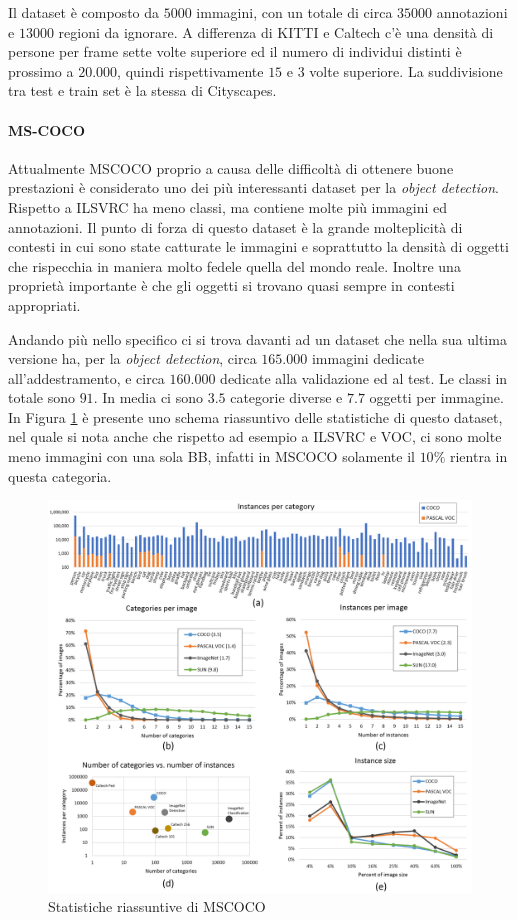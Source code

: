 Il dataset è composto da $5000$ immagini, con un totale di circa $35000$ annotazioni e $13000$ regioni da ignorare. A differenza di KITTI e Caltech c'è una densità di persone per frame sette volte superiore ed il numero di individui distinti è prossimo a $20.000$, quindi rispettivamente $15$ e $3$ volte superiore.  La suddivisione tra test e train set è la stessa di Cityscapes. 

\paragraph{MS-COCO} \cite{lin2014microsoft}
Attualmente \ac{MSCOCO} proprio a causa delle difficoltà di ottenere buone prestazioni è considerato uno dei più interessanti dataset per la \textit{object detection}. Rispetto a \ac{ILSVRC} ha meno classi, ma contiene molte più immagini ed annotazioni. Il punto di forza di questo dataset è la grande molteplicità di contesti in cui sono state catturate le immagini e soprattutto la densità di oggetti che rispecchia in maniera molto fedele quella del mondo reale. Inoltre una proprietà importante è che gli oggetti si trovano quasi sempre in contesti appropriati.

Andando più nello specifico ci si trova davanti ad un dataset che nella sua ultima versione ha, per la \textit{object detection}, circa $165.000$ immagini dedicate all'addestramento, e circa $160.000$ dedicate alla validazione ed al test. Le classi in totale sono $91$. In media ci sono $3.5$ categorie diverse e $7.7$ oggetti per immagine. In Figura \ref{fig:dataanalysis_coco} è presente uno schema riassuntivo delle statistiche di questo dataset, nel quale si nota anche che rispetto ad esempio a \ac{ILSVRC} e \ac{VOC}, ci sono molte meno immagini con una sola \ac{BB}, infatti in \ac{MSCOCO} solamente il $10\%$ rientra in questa categoria.
\begin{figure}
    \centering
    \includegraphics[width=\textwidth]{images/dataanalysis.png}
    \caption{Statistiche riassuntive di \ac{MSCOCO} \cite{lin2014microsoft}}
    \label{fig:dataanalysis_coco}
\end{figure}

